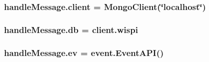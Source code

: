 \subsubsection[{client}]{\setlength{\rightskip}{0pt plus 5cm}handle\+Message.\+client = Mongo\+Client(\char`\"{}localhost\char`\"{})}\label{namespacehandle_message_a2d21b129e25db664530539afa059b572}
\subsubsection[{db}]{\setlength{\rightskip}{0pt plus 5cm}handle\+Message.\+db = client.\+wispi}\label{namespacehandle_message_a9893487154487b1fbe5ba29cbe7bf129}
\subsubsection[{ev}]{\setlength{\rightskip}{0pt plus 5cm}handle\+Message.\+ev = {\bf event.\+Event\+A\+PI}()}\label{namespacehandle_message_a40627d83f887c23ffc3d38a7ce14a955}
